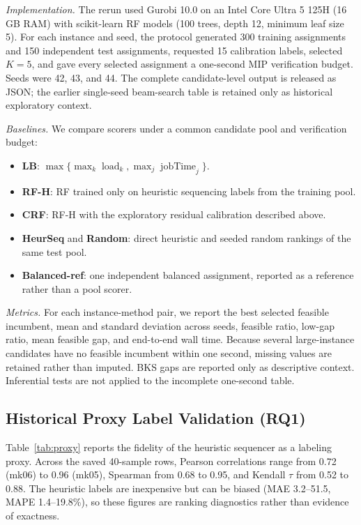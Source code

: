\documentclass[12pt]{article}
\begin{document}
\textit{Implementation.} The rerun used Gurobi 10.0 on an Intel Core Ultra 5 125H (16 GB RAM) with scikit-learn RF models (100 trees, depth 12, minimum leaf size 5). For each instance and seed, the protocol generated 300 training assignments and 150 independent test assignments, requested 15 calibration labels, selected $K=5$, and gave every selected assignment a one-second MIP verification budget. Seeds were 42, 43, and 44. The complete candidate-level output is released as JSON; the earlier single-seed beam-search table is retained only as historical exploratory context.

\textit{Baselines.} We compare scorers under a common candidate pool and verification budget:
\begin{itemize}[leftmargin=1.2em]
\item \textbf{LB}: $\max\{\max_k\operatorname{load}_k,\max_j\operatorname{jobTime}_j\}$.
\item \textbf{RF-H}: RF trained only on heuristic sequencing labels from the training pool.
\item \textbf{CRF}: RF-H with the exploratory residual calibration described above.
\item \textbf{HeurSeq} and \textbf{Random}: direct heuristic and seeded random rankings of the same test pool.
\item \textbf{Balanced-ref}: one independent balanced assignment, reported as a reference rather than a pool scorer.
\end{itemize}

\textit{Metrics.} For each instance-method pair, we report the best selected feasible incumbent, mean and standard deviation across seeds, feasible ratio, low-gap ratio, mean feasible gap, and end-to-end wall time. Because several large-instance candidates have no feasible incumbent within one second, missing values are retained rather than imputed. BKS gaps are reported only as descriptive context. Inferential tests are not applied to the incomplete one-second table.

\subsection{Historical Proxy Label Validation (RQ1)}

Table~\ref{tab:proxy} reports the fidelity of the heuristic sequencer as a labeling proxy. Across the saved 40-sample rows, Pearson correlations range from 0.72 (mk06) to 0.96 (mk05), Spearman from 0.68 to 0.95, and Kendall $\tau$ from 0.52 to 0.88. The heuristic labels are inexpensive but can be biased (MAE 3.2--51.5, MAPE 1.4--19.8\%), so these figures are ranking diagnostics rather than evidence of exactness.
\end{document}
